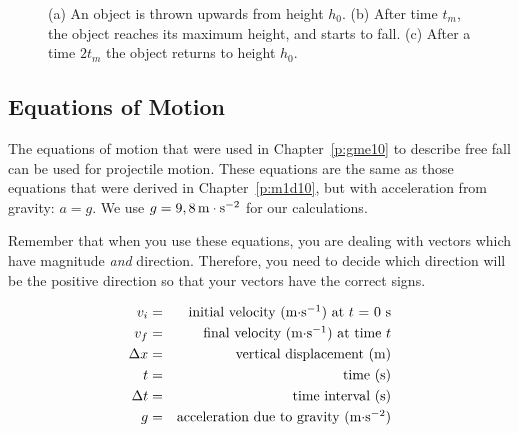 \begin{figure}[htbp]
\begin{center}
\caption{(a) An object is thrown upwards from height $h_0$. (b) After time $t_m$, the object reaches its maximum height, and starts to fall. (c) After a time $2t_m$ the object returns to height $h_0$.}
\label{fig:p:m:m2d12:maxheighttime}
\end{center}
\end{figure}


\subsection{Equations of Motion}
The equations of motion that were used in Chapter~\ref{p:gme10} to describe free fall can be used for projectile motion. These equations are the same as those equations that were derived in Chapter~\ref{p:m1d10}, but with acceleration from gravity: $a=g$. We use $g=9,8\,\mathrm{m \cdot s^{-2}}$ for our calculations. 

Remember that when you use these equations, you are dealing with vectors which have magnitude \textit{and} direction. Therefore, you need to decide which direction will be the positive direction so that your vectors have the correct signs. 

\begin{eqnarray*}
v_i &=& \mbox{initial velocity (m$\cdot$s$^{-1}$) at $t$ = 0 s} \\
v_f &=& \mbox{final velocity (m$\cdot$s$^{-1}$) at time $t$}\\
\Delta x &=& \mbox{vertical displacement (m)} \\
t &=& \mbox{time (s)} \\
\Delta t &=& \mbox{time interval (s)} \\
g &=& \mbox{acceleration due to gravity (m$\cdot$s$^{-2}$)}
\end{eqnarray*}

